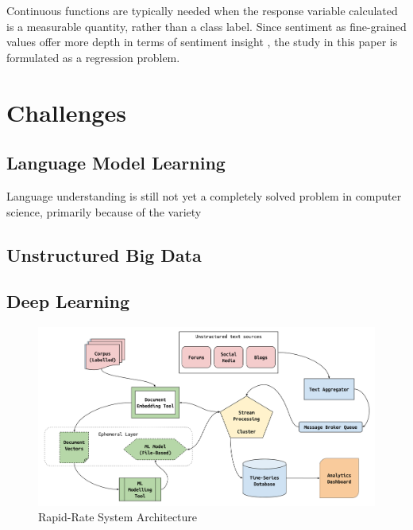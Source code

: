 \documentclass[conference]{IEEEtran}
\begin{document}
        Continuous functions are typically needed when the response variable calculated is a measurable quantity, rather than a class label. Since sentiment as fine-grained values offer more depth in terms of sentiment insight \cite{drake2008sentiment}, the study in this paper is formulated as a regression problem.

\vspace{5mm}

\section{Challenges}

    \subsection{Language Model Learning}
        Language understanding is still not yet a completely solved problem in computer science, primarily because of the variety

    \subsection{Unstructured Big Data}

    \subsection{Deep Learning}

\vspace{5mm}

\begin{figure}[ht] \label{fig:system-architecture}
    \centering
    \includegraphics[width=\textwidth]{images/rapid_rate_system_arch_1.png}
    \caption{Rapid-Rate System Architecture}
\end{figure}
\end{document}
